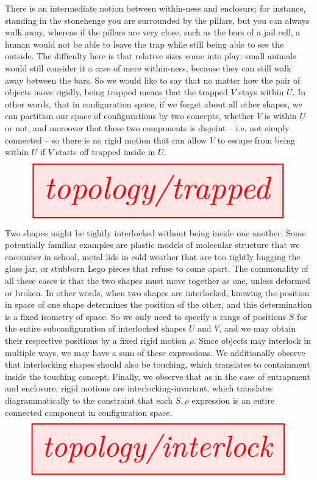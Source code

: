 \begin{myboxB}
\begin{defn}[Trapping]\label{defn:trapped}
There is an intermediate notion between within-ness and enclosure; for instance, standing in the stonehenge you are surrounded by the pillars, but you can always walk away, whereas if the pillars are very close, such as the bars of a jail cell, a human would not be able to leave the trap while still being able to see the outside. The difficulty here is that relative sizes come into play: small animals would still consider it a case of mere within-ness, because they can still walk away between the bars. So we would like to say that no matter how the pair of objects move rigidly, being trapped means that the trapped $V$ stays within $U$. In other words, that in configuration space, if we forget about all other shapes, we can partition our space of configurations by two concepts, whether $V$ is within $U$ or not, and moreover that these two components is disjoint -- i.e. not simply connected -- so there is no rigid motion that can allow $V$ to escape from being within $U$ if $V$ starts off trapped inside in $U$.
\[\resizebox{\textwidth}{!}{\tikzfig{topology/trapped}}\]
\end{defn}
\end{myboxB}

\begin{myboxR}
\begin{defn}[Interlock]\label{defn:interlocked}
Two shapes might be tightly interlocked without being inside one another. Some potentially familiar examples are plastic models of molecular structure that we encounter in school, metal lids in cold weather that are too tightly hugging the glass jar, or stubborn Lego pieces that refuse to come apart. The commonality of all these cases is that the two shapes must move together as one, unless deformed or broken. In other words, when two shapes are interlocked, knowing the position in space of one shape determines the position of the other, and this determination is a fixed isometry of space. So we only need to specify a range of positions $S$ for the entire subconfiguration of interlocked shapes $U$ and $V$, and we may obtain their respective positions by a fixed rigid motion $\rho$. Since objects may interlock in multiple ways, we may have a sum of these expressions. We additionally observe that interlocking shapes should also be touching, which translates to containment inside the touching concept. Finally, we observe that as in the case of entrapment and enclosure, rigid motions are interlocking-invariant, which translates diagrammatically to the constraint that each $S,\rho$ expression is an entire connected component in configuration space.
\[\resizebox{\textwidth}{!}{\tikzfig{topology/interlock}}\]
\end{defn}
\end{myboxR}

